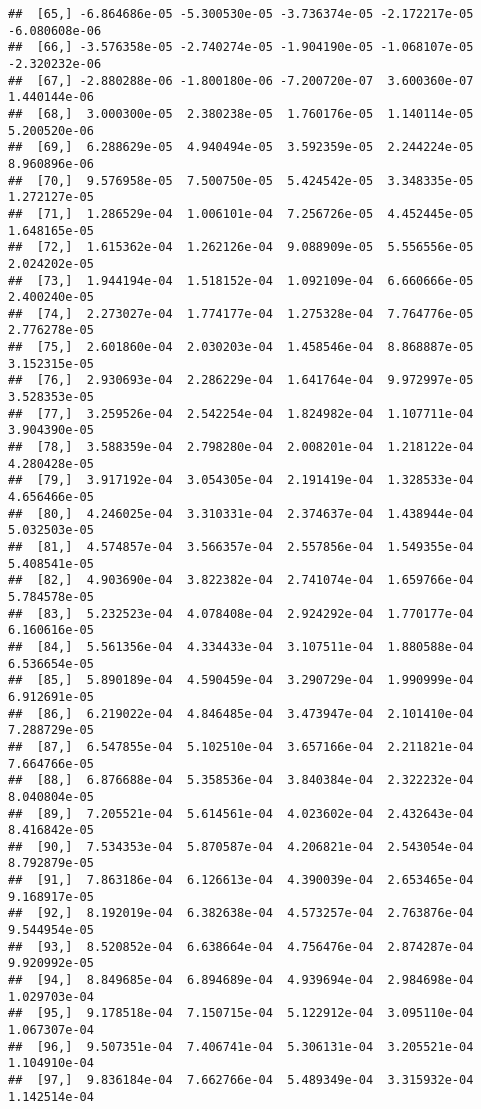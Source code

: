 \documentclass[
]{article}
\begin{document}
\begin{verbatim}
##  [65,] -6.864686e-05 -5.300530e-05 -3.736374e-05 -2.172217e-05 -6.080608e-06
##  [66,] -3.576358e-05 -2.740274e-05 -1.904190e-05 -1.068107e-05 -2.320232e-06
##  [67,] -2.880288e-06 -1.800180e-06 -7.200720e-07  3.600360e-07  1.440144e-06
##  [68,]  3.000300e-05  2.380238e-05  1.760176e-05  1.140114e-05  5.200520e-06
##  [69,]  6.288629e-05  4.940494e-05  3.592359e-05  2.244224e-05  8.960896e-06
##  [70,]  9.576958e-05  7.500750e-05  5.424542e-05  3.348335e-05  1.272127e-05
##  [71,]  1.286529e-04  1.006101e-04  7.256726e-05  4.452445e-05  1.648165e-05
##  [72,]  1.615362e-04  1.262126e-04  9.088909e-05  5.556556e-05  2.024202e-05
##  [73,]  1.944194e-04  1.518152e-04  1.092109e-04  6.660666e-05  2.400240e-05
##  [74,]  2.273027e-04  1.774177e-04  1.275328e-04  7.764776e-05  2.776278e-05
##  [75,]  2.601860e-04  2.030203e-04  1.458546e-04  8.868887e-05  3.152315e-05
##  [76,]  2.930693e-04  2.286229e-04  1.641764e-04  9.972997e-05  3.528353e-05
##  [77,]  3.259526e-04  2.542254e-04  1.824982e-04  1.107711e-04  3.904390e-05
##  [78,]  3.588359e-04  2.798280e-04  2.008201e-04  1.218122e-04  4.280428e-05
##  [79,]  3.917192e-04  3.054305e-04  2.191419e-04  1.328533e-04  4.656466e-05
##  [80,]  4.246025e-04  3.310331e-04  2.374637e-04  1.438944e-04  5.032503e-05
##  [81,]  4.574857e-04  3.566357e-04  2.557856e-04  1.549355e-04  5.408541e-05
##  [82,]  4.903690e-04  3.822382e-04  2.741074e-04  1.659766e-04  5.784578e-05
##  [83,]  5.232523e-04  4.078408e-04  2.924292e-04  1.770177e-04  6.160616e-05
##  [84,]  5.561356e-04  4.334433e-04  3.107511e-04  1.880588e-04  6.536654e-05
##  [85,]  5.890189e-04  4.590459e-04  3.290729e-04  1.990999e-04  6.912691e-05
##  [86,]  6.219022e-04  4.846485e-04  3.473947e-04  2.101410e-04  7.288729e-05
##  [87,]  6.547855e-04  5.102510e-04  3.657166e-04  2.211821e-04  7.664766e-05
##  [88,]  6.876688e-04  5.358536e-04  3.840384e-04  2.322232e-04  8.040804e-05
##  [89,]  7.205521e-04  5.614561e-04  4.023602e-04  2.432643e-04  8.416842e-05
##  [90,]  7.534353e-04  5.870587e-04  4.206821e-04  2.543054e-04  8.792879e-05
##  [91,]  7.863186e-04  6.126613e-04  4.390039e-04  2.653465e-04  9.168917e-05
##  [92,]  8.192019e-04  6.382638e-04  4.573257e-04  2.763876e-04  9.544954e-05
##  [93,]  8.520852e-04  6.638664e-04  4.756476e-04  2.874287e-04  9.920992e-05
##  [94,]  8.849685e-04  6.894689e-04  4.939694e-04  2.984698e-04  1.029703e-04
##  [95,]  9.178518e-04  7.150715e-04  5.122912e-04  3.095110e-04  1.067307e-04
##  [96,]  9.507351e-04  7.406741e-04  5.306131e-04  3.205521e-04  1.104910e-04
##  [97,]  9.836184e-04  7.662766e-04  5.489349e-04  3.315932e-04  1.142514e-04

\end{verbatim}
\end{document}
